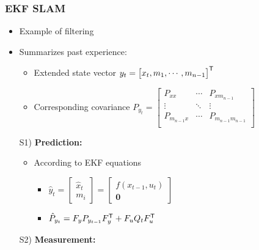 \subsubsection{EKF SLAM}
\begin{itemize}
    \item Example of filtering
    \item Summarizes past experience:
        \begin{itemize}
            \item Extended state vector $y_t =
                \begin{bmatrix}
                    x_t,  m_1, \cdots, m_{n-1}
                \end{bmatrix}^{\mathsf{T}}$
            \item Corresponding covariance $P_{y_t} =
                \begin{bmatrix}
                    P_{xx} & \cdots & P_{xm_{n-1}} \\
                    \vdots & \ddots & \vdots \\
                    P_{m_{n-1}x} & \cdots & P_{m_{n-1}m_{n-1}} \\
                \end{bmatrix}$
        \end{itemize}
    \item[S1)] \textbf{Prediction:}
        \begin{itemize}
            \item According to EKF equations
                \begin{itemize}
                    \item $\hat y_t =
                        \begin{bmatrix}
                          \hat x_t \\
                          m_i
                        \end{bmatrix} =
                        \begin{bmatrix}
                          f(x_{t-1}, u_t) \\
                          \mathbf 0
                        \end{bmatrix}$
                    \item $\hat P_{y_t} = F_y P_{y_{t-1}}F_y^{\mathsf{T}} + F_uQ_tF_u^{\mathsf{T}}$
                \end{itemize}
        \end{itemize}
    \item[S2)] \textbf{Measurement:}
        \begin{itemize}

\end{itemize}
\end{itemize}
